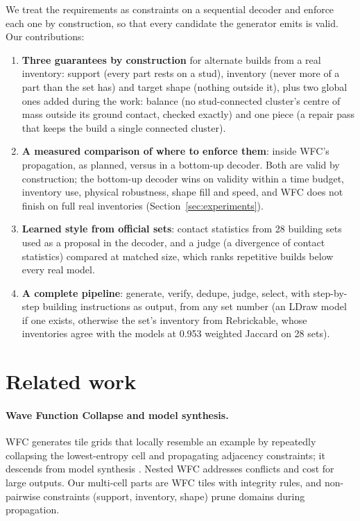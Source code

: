 \documentclass[10pt,twocolumn]{article}
\begin{document}
We treat the requirements as constraints on a sequential decoder and enforce each one by construction, so that every
candidate the generator emits is valid. Our contributions:
\begin{enumerate}
  \item \textbf{Three guarantees by construction} for alternate builds from a real inventory: support (every part
    rests on a stud), inventory (never more of a part than the set has) and target shape (nothing outside it),
    plus two global ones added during the work: balance (no stud-connected cluster's centre of mass outside its
    ground contact, checked exactly) and one piece (a repair pass that keeps the build a single connected cluster).
  \item \textbf{A measured comparison of where to enforce them}: inside WFC's propagation, as planned, versus in a
    bottom-up decoder. Both are valid by construction; the bottom-up decoder wins on validity within a time budget,
    inventory use, physical robustness, shape fill and speed, and WFC does not finish on full real inventories
    (Section~\ref{sec:experiments}).
  \item \textbf{Learned style from official sets}: contact statistics from 28 building sets used as a proposal in
    the decoder, and a judge (a divergence of contact statistics) compared at matched size, which ranks repetitive
    builds below every real model.
  \item \textbf{A complete pipeline}: generate, verify, dedupe, judge, select, with step-by-step building
    instructions as output, from any set number (an LDraw model if one exists, otherwise the set's inventory from
    Rebrickable, whose inventories agree with the models at 0.953 weighted Jaccard on 28 sets).
\end{enumerate}

\section{Related work}

\paragraph{Wave Function Collapse and model synthesis.}
WFC \cite{gumin2016wfc} generates tile grids that locally resemble an example by repeatedly collapsing the
lowest-entropy cell and propagating adjacency constraints; it descends from model synthesis \cite{merrell2007model}.
Nested WFC \cite{nie2023nwfc} addresses conflicts and cost for large outputs. Our multi-cell parts are WFC tiles with
integrity rules, and non-pairwise constraints (support, inventory, shape) prune domains during propagation.
\end{document}
